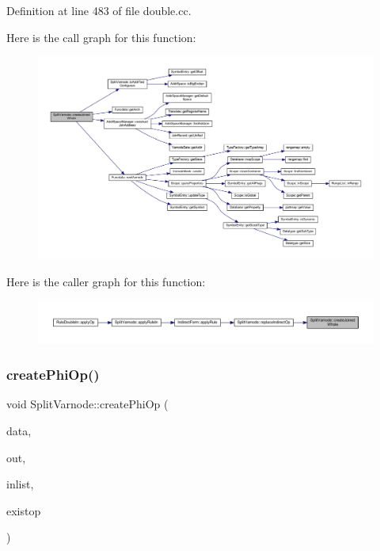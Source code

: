 Definition at line 483 of file double.\+cc.

Here is the call graph for this function\+:
\nopagebreak
\begin{figure}[H]
\begin{center}
\leavevmode
\includegraphics[width=350pt]{class_split_varnode_ad1c85dd3deb4c5e9a18e0c815feec95a_cgraph}
\end{center}
\end{figure}
Here is the caller graph for this function\+:
\nopagebreak
\begin{figure}[H]
\begin{center}
\leavevmode
\includegraphics[width=350pt]{class_split_varnode_ad1c85dd3deb4c5e9a18e0c815feec95a_icgraph}
\end{center}
\end{figure}
\mbox{\label{class_split_varnode_afb3f6dcf9f8412ffb6120f652991cce6}} 
\subsubsection{\texorpdfstring{createPhiOp()}{createPhiOp()}}
{\footnotesize\ttfamily void Split\+Varnode\+::create\+Phi\+Op (\begin{DoxyParamCaption}\item[{\mbox{\hyperlink{class_funcdata}{Funcdata}} \&}]{data,  }\item[{\mbox{\hyperlink{class_split_varnode}{Split\+Varnode}} \&}]{out,  }\item[{vector$<$ \mbox{\hyperlink{class_split_varnode}{Split\+Varnode}} $>$ \&}]{inlist,  }\item[{\mbox{\hyperlink{class_pcode_op}{Pcode\+Op}} $\ast$}]{existop }\end{DoxyParamCaption})\hspace{0.3cm}{\ttfamily [static]}}



